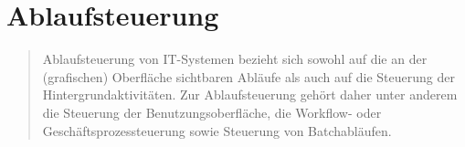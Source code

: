 
	



\section{Ablaufsteuerung}

\begin{quote}
	Ablaufsteuerung von IT-Systemen bezieht sich sowohl auf die an der (grafischen) Oberfläche sichtbaren Abläufe als auch auf die Steuerung der Hintergrundaktivitäten. Zur Ablaufsteuerung gehört daher unter anderem die Steuerung der Benutzungsoberfläche, die Workflow- oder Geschäftsprozessteuerung sowie Steuerung von Batchabläufen.
\end{quote}



\begin{quote}
\end{quote}



